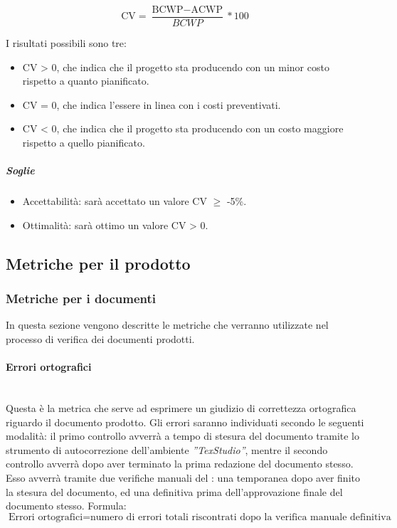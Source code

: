 	\begin{displaymath}
\mbox{CV}= \frac{\mbox{BCWP}-\mbox{ACWP}}{BCWP}*100\end{displaymath}

I risultati possibili sono tre:

\begin{itemize}
\item CV > 0, che indica che il progetto sta producendo con un minor costo rispetto a quanto pianificato.
\item CV = 0, che indica l'essere in linea con i costi preventivati.
\item CV < 0, che indica che il progetto sta producendo con un costo maggiore rispetto a quello pianificato.
\end{itemize}

\subparagraph{Soglie}
\begin{itemize}
\item Accettabilità: sarà accettato un valore CV $\ge$ -5\%.
\item Ottimalità: sarà ottimo un valore CV > 0.
\end{itemize}

\subsection{Metriche per il prodotto}
\label{AppB:metricheProd}
\subsubsection{Metriche per i documenti}
\label{AppB:metricheDoc}
In questa sezione vengono descritte le metriche che verranno utilizzate nel processo di verifica dei documenti prodotti.
\paragraph{Errori ortografici}
\label{AppB:ErroriOrtografici}
	~\\Questa è la metrica che serve ad esprimere un giudizio di correttezza ortografica riguardo il documento prodotto. Gli errori saranno individuati secondo le seguenti modalità:
il primo controllo avverrà a tempo di stesura del documento tramite lo strumento di autocorrezione dell'ambiente \emph{''TexStudio''}, mentre il secondo controllo avverrà dopo aver terminato la prima redazione del documento stesso. Esso avverrà tramite due verifiche manuali del \ver{}: una temporanea dopo aver finito la stesura del documento, ed una definitiva prima dell'approvazione finale del documento stesso.
\newline Formula:
\begin{displaymath}
\mbox{Errori ortografici}= {\mbox{numero di errori totali riscontrati dopo la verifica manuale definitiva}}
\end{displaymath}

